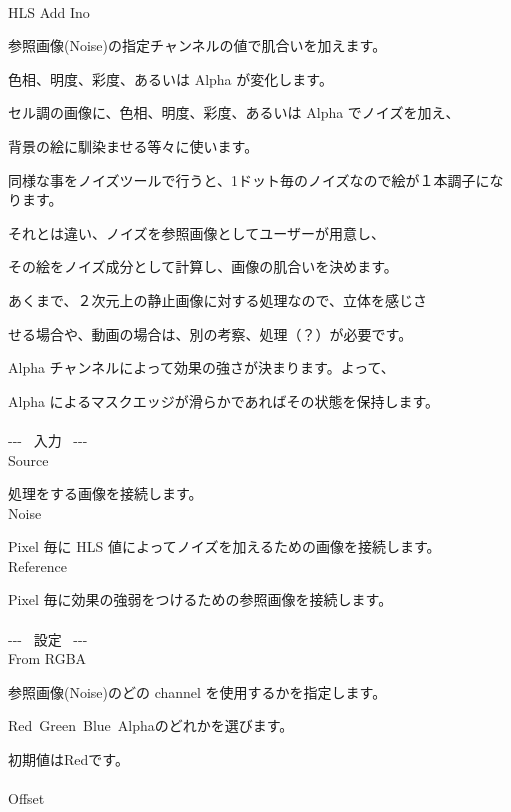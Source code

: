 \documentclass[a4paper,12pt]{article}
\begin{document}
\thispagestyle{empty}

\Large
\noindent \\
HLS Add Ino\medskip
\par
\normalsize
参照画像(Noise)の指定チャンネルの値で肌合いを加えます。\par
色相、明度、彩度、あるいは Alpha が変化します。\\
\par
セル調の画像に、色相、明度、彩度、あるいは Alpha でノイズを加え、\par
背景の絵に馴染ませる等々に使います。\par
同様な事をノイズツールで行うと、1ドット毎のノイズなので絵が１本調子になります。\par
それとは違い、ノイズを参照画像としてユーザーが用意し、\par
その絵をノイズ成分として計算し、画像の肌合いを決めます。\\
\par
あくまで、２次元上の静止画像に対する処理なので、立体を感じさ\par
せる場合や、動画の場合は、別の考察、処理（？）が必要です。\\
\par
Alpha チャンネルによって効果の強さが決まります。よって、\par
Alpha によるマスクエッジが滑らかであればその状態を保持します。\\
\\
-{-}- \ 入力 \ -{-}-\\
Source\par
処理をする画像を接続します。\\
Noise\par
Pixel 毎に HLS 値によってノイズを加えるための画像を接続します。\\
Reference\par
Pixel 毎に効果の強弱をつけるための参照画像を接続します。\\
\\
-{-}- \ 設定 \ -{-}-\\
From RGBA\par
参照画像(Noise)のどの channel を使用するかを指定します。\par
\textquotedbl Red\textquotedbl \ \textquotedbl Green\textquotedbl \ \textquotedbl Blue\textquotedbl \ \textquotedbl Alpha\textquotedbl のどれかを選びます。\par
初期値は\textquotedbl Red\textquotedbl です。\\
\\
Offset\par
\end{document}
